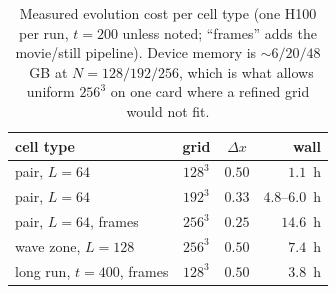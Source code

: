 \documentclass[twocolumn,floatfix,aps,prd,nofootinbib]{revtex4-2}
\begin{document}
\begin{table}[t]
\caption{Measured evolution cost per cell type (one H100 per run, $t=200$
unless noted; ``frames'' adds the movie/still pipeline). Device memory is
${\sim}6/20/48$~GB at $N=128/192/256$, which is what allows uniform $256^3$
on one card where a refined grid would not fit.}
\label{tab:cost}
\begin{ruledtabular}
\begin{tabular}{lccr}
cell type & grid & $\Delta x$ & wall \\
\hline
pair, $L=64$ & $128^3$ & $0.50$ & $1.1$~h \\
pair, $L=64$ & $192^3$ & $0.33$ & $4.8$--$6.0$~h \\
pair, $L=64$, frames & $256^3$ & $0.25$ & $14.6$~h \\
wave zone, $L=128$ & $256^3$ & $0.50$ & $7.4$~h \\
long run, $t=400$, frames & $128^3$ & $0.50$ & $3.8$~h \\
\end{tabular}
\end{ruledtabular}
\end{table}
\end{document}
